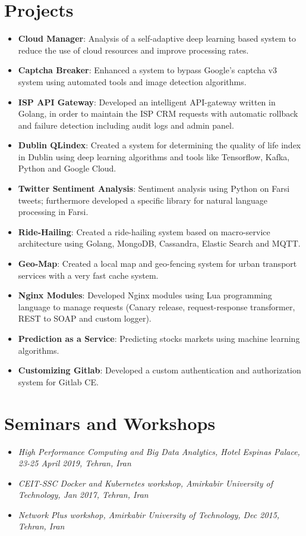 \documentclass[letterpaper,11pt]{article}
\newcommand{\resumeItem}[2]{
  \item\small{
    \textbf{#1}{: #2 \vspace{-2pt}}
  }
}
\newcommand{\resumeSubItem}[2]{\resumeItem{#1}{#2}\vspace{-4pt}}
\newcommand{\resumeSubHeadingListStart}{\begin{itemize}[leftmargin=*]}
\newcommand{\resumeSubHeadingListEnd}{\end{itemize}}
\begin{document}
{\section{Projects}
  \resumeSubHeadingListStart
    \resumeSubItem{Cloud Manager}
      {Analysis of a self-adaptive deep learning based system to reduce the use of cloud resources and improve processing rates.}
    \resumeSubItem{Captcha Breaker}
      {Enhanced a system to bypass Google's captcha v3 system using automated tools and image detection algorithms.}
    \resumeSubItem{ISP API Gateway}
      {Developed an intelligent API-gateway written in Golang, in order to maintain the ISP CRM requests with automatic rollback and failure detection including audit logs and admin panel.}
    \resumeSubItem{Dublin QLindex}
      {Created a system for determining the quality of life index in Dublin using deep learning algorithms and tools like Tensorflow, Kafka, Python and Google Cloud.}
    \resumeSubItem{Twitter Sentiment Analysis}
      {Sentiment analysis using Python on Farsi tweets; furthermore developed a specific library for natural language processing in Farsi.}
    \resumeSubItem{Ride-Hailing}
      {Created a ride-hailing system based on macro-service architecture using Golang, MongoDB, Cassandra, Elastic Search and MQTT.}
    \resumeSubItem{Geo-Map}
      {Created a local map and geo-fencing system for urban transport services with a very fast cache system.}
    \resumeSubItem{Nginx Modules}
      {Developed Nginx modules using Lua programming language to manage requests (Canary release, request-response transformer, REST to SOAP and custom logger).}
    \resumeSubItem{Prediction as a Service}
      {Predicting stocks markets using machine learning algorithms.}
    \resumeSubItem{Customizing Gitlab}
      {Developed a custom authentication and authorization system for Gitlab CE.}
  \resumeSubHeadingListEnd


\section{Seminars and Workshops}
\begin{itemize}
	\item {\textit {High Performance Computing and Big Data Analytics, Hotel Espinas Palace, 23-25 April 2019, Tehran, Iran }}
	\item {\textit {CEIT-SSC Docker and Kubernetes workshop, Amirkabir University of Technology, Jan 2017, Tehran, Iran }}
	\item {\textit {Network Plus workshop, Amirkabir University of Technology, Dec 2015, Tehran, Iran }}\end{itemize}

}
\end{document}
